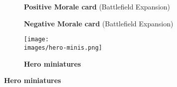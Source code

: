 \begin{figure}[H]
  \centering
  \begin{subfigure}[b]{0.25\linewidth}
    \caption{\textbf{Positive Morale card} (Battlefield Expansion)}
  \end{subfigure}
  \begin{subfigure}[b]{0.25\linewidth}
    \caption{\textbf{Negative Morale card} (Battlefield Expansion)}
  \end{subfigure}
  \begin{subfigure}[b]{0.4\linewidth}
    \centering
    \texttt{[image: \\images/hero-minis.png]}
    \caption{\textbf{Hero miniatures}}
  \end{subfigure}
\end{figure}
\vspace*{-2em}

\clearpage

